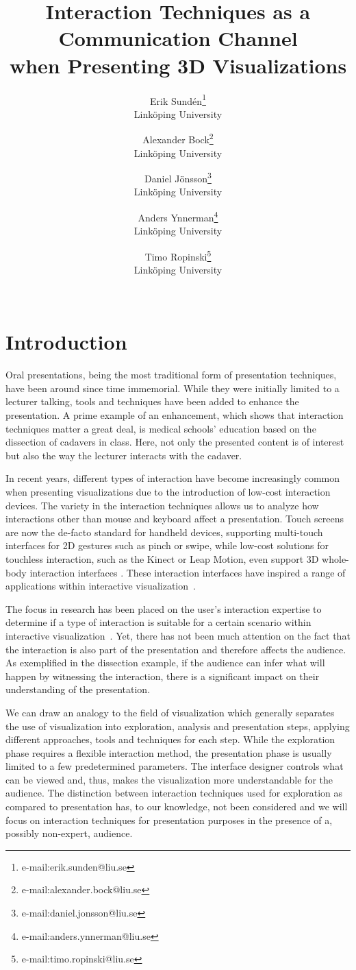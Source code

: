 \documentclass[journal]{vgtc}                %
\title{Interaction Techniques as a Communication Channel\\when Presenting 3D Visualizations} %
\author{Erik Sund\'en\thanks{e-mail:erik.sunden@liu.se}\\ %
        \scriptsize Link{\"o}ping University %
\and Alexander Bock\thanks{e-mail:alexander.bock@liu.se}\\ %
			   \scriptsize Link{\"o}ping University %
\and Daniel J\"onsson\thanks{e-mail:daniel.jonsson@liu.se}\\ %
          \scriptsize Link{\"o}ping University %
\and Anders Ynnerman\thanks{e-mail:anders.ynnerman@liu.se}\\ %
          \scriptsize Link{\"o}ping University %
\and Timo Ropinski\thanks{e-mail:timo.ropinski@liu.se}\\ %
           \scriptsize Link{\"o}ping University\\ \\}
\begin{document}
\maketitle

\section{Introduction}\label{sec:introduction}
Oral presentations, being the most traditional form of presentation techniques, have been around since time immemorial.
While they were initially limited to a lecturer talking, tools and techniques have been added to enhance the presentation.
A prime example of an enhancement, which shows that interaction techniques matter a great deal, is medical schools' education based on the dissection of cadavers in class.
Here, not only the presented content is of interest but also the way the lecturer interacts with the cadaver.

In recent years, different types of interaction have become increasingly common when presenting visualizations due to the introduction of low-cost interaction devices.
The variety in the interaction techniques allows us to analyze how interactions other than mouse and keyboard affect a presentation.
Touch screens are now the de-facto standard for handheld devices, supporting multi-touch interfaces for 2D gestures such as pinch or swipe, while low-cost solutions for touchless interaction, such as the Kinect or Leap Motion, even support 3D whole-body interaction interfaces \cite{978-0-85729-432-6, Shoemaker:2010:BIT:1868914.1868967}. 
These interaction interfaces have inspired a range of applications within interactive visualization~\cite{zora82163, Jalaliniya:2013:TIM:2494091.2497332, OHaraGSPVMCCRDC14, 0724-4983}.

The focus in research has been placed on the user's interaction expertise to determine if a type of interaction is suitable for a certain scenario within interactive visualization~\cite{5693835, so64840, DBLP:journals/tvcg/YiKSJ07}.
Yet, there has not been much attention on the fact that the interaction is also part of the presentation and therefore affects the audience.
As exemplified in the dissection example, if the audience can infer what will happen by witnessing the interaction, there is a significant impact on their understanding of the presentation.

We can draw an analogy to the field of visualization which generally separates the use of visualization into exploration, analysis and presentation steps, applying different approaches, tools and techniques for each step.
While the exploration phase requires a flexible interaction method, the presentation phase is usually limited to a few predetermined parameters.
The interface designer controls what can be viewed and, thus, makes the visualization more understandable for the audience.
The distinction between interaction techniques used for exploration as compared to presentation has, to our knowledge, not been considered and we will focus on interaction techniques for presentation purposes in the presence of a, possibly non-expert, audience.
\end{document}
